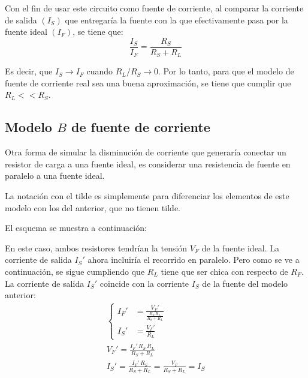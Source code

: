 \documentclass[a5paper,12pt,twoside]{book}
\begin{document}
Con el fin de usar este circuito como fuente de corriente, al comparar la corriente de salida $(I_S)$ que entregaría la fuente con la que efectivamente pasa por la fuente ideal $(I_F)$, se tiene que:
\begin{equation*}
    \frac{I_S}{I_F} = \frac{R_S}{R_S + R_L}
\end{equation*}

Es decir, que $I_S \to I_F$ cuando $R_L/R_S \to 0$.
Por lo tanto, para que el modelo de fuente de corriente real sea una buena aproximación, se tiene que cumplir que $R_L<<R_S$.

\begin{center}
    \def\svgwidth{0.6\linewidth}
    
\end{center}


\subsection{Modelo $B$ de fuente de corriente}

Otra forma de simular la disminución de corriente que generaría conectar un resistor de carga a una fuente ideal, es considerar una resistencia de fuente en paralelo a una fuente ideal.

La notación con el tilde es simplemente para diferenciar los elementos de este modelo con los del anterior, que no tienen tilde.

El esquema se muestra a continuación:

\begin{multicols}{2}
    \begin{center}
        \def\svgwidth{0.9\linewidth}
        
    \end{center}
    \begin{center}
        \def\svgwidth{0.9\linewidth}
        
    \end{center}
\end{multicols}

En este caso, ambos resistores tendrían la tensión $V_F$ de la fuente ideal.
La corriente de salida $I_S'$ ahora incluiría el recorrido en paralelo.
Pero como se ve a continuación, se sigue cumpliendo que $R_L$ tiene que ser chica con respecto de $R_F$.
La corriente de salida $I_S'$ coincide con la corriente $I_S$ de la fuente del modelo anterior:
\begin{gather*}
    \left\{
    \begin{aligned}
        I_F' &= \frac{V_F'}{\frac{R_S \, R_L}{R_S + R_L}}
        \\[1ex]
        I_S' &= \frac{V_F'}{R_L}
    \end{aligned}
    \right.
    \\[1em]
    V_F' = \frac{I_F' \, R_S \, R_L}{R_S + R_L}
    \\[1em]
    I_S' = \frac{I_F' \, R_S}{R_S + R_L} = \frac{V_F}{R_S + R_L} = I_S
\end{gather*}
\end{document}
